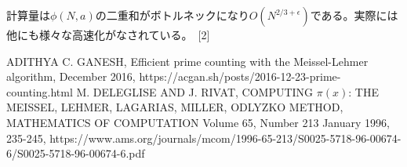 \documentclass[a4paper]{jsarticle}
\begin{document}
計算量は$\phi(N,a)$の二重和がボトルネックになり$O(N^{2/3+\epsilon})$である。実際には他にも様々な高速化がなされている。~[2]



\begin{thebibliography}{9}
\bibitem{}ADITHYA C. GANESH, Efficient prime counting with the Meissel-Lehmer algorithm, December 2016, https://acgan.sh/posts/2016-12-23-prime-counting.html
\bibitem{}M. DELEGLISE AND J. RIVAT, COMPUTING $\pi(x)$: THE MEISSEL, LEHMER, LAGARIAS, MILLER, ODLYZKO METHOD, MATHEMATICS OF COMPUTATION Volume 65, Number 213 January 1996, 235-245, https://www.ams.org/journals/mcom/1996-65-213/S0025-5718-96-00674-6/S0025-5718-96-00674-6.pdf
\end{thebibliography}
\end{document}
